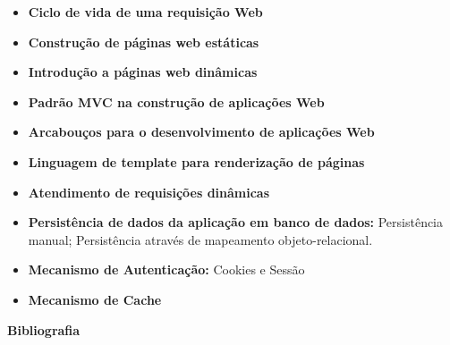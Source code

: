 \begin{itemize}

\item \textbf{Ciclo de vida de uma requisição Web}
\item \textbf{Construção de páginas web estáticas}
\item \textbf{Introdução a páginas web dinâmicas}
\item \textbf{Padrão MVC na construção de aplicações Web}
\item \textbf{Arcabouços para o desenvolvimento de aplicações Web}
\item \textbf{Linguagem de template para renderização de páginas}
\item \textbf{Atendimento de requisições dinâmicas}
\item \textbf{Persistência de dados da aplicação em banco de dados:}
    Persistência manual; Persistência através de mapeamento objeto-relacional.
\item \textbf{Mecanismo de Autenticação:}
    Cookies e Sessão
\item \textbf{Mecanismo de Cache}
  

\end{itemize}


%
%
%


\begin{snugshade}\begin{center}\textbf{
    Bibliografia
}\end{center}\end{snugshade}

